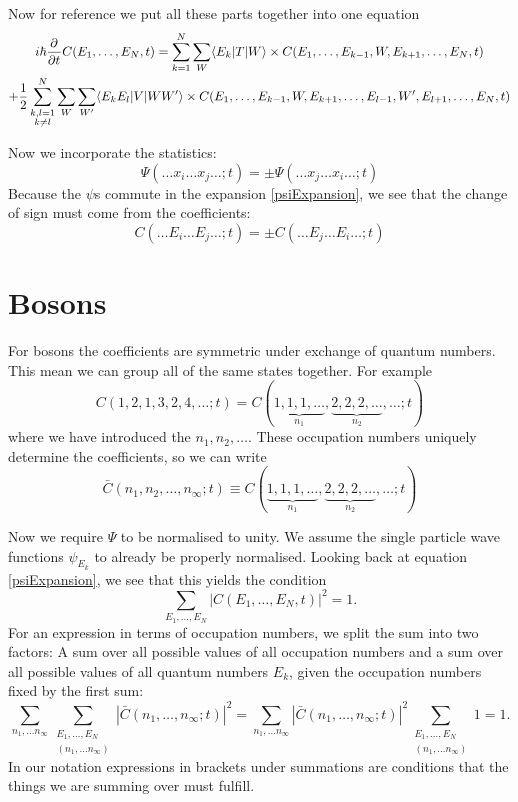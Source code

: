 Now for reference we put all these parts together into one equation
\begin{multline}
i\hbar \pd{}{t} C(E_1, \ldots, E_N,t) = \sum^N_{k=1} \sum_{W} \braket[T]{E_k}{W} \times C(E_1, \ldots, E_{k-1}, W, E_{k+1}, \ldots, E_N,t) \\ +
\frac{1}{2}\sum^N_{\substack{k,l=1 \\ k \neq l}} \sum_W \sum_{W'} \braket[V]{E_kE_l}{WW'} \times C(E_1, \ldots, E_{k-1}, W, E_{k+1}, \ldots, E_{l-1},W',E_{l+1}, \ldots, E_N,t) \label{modSchr}
\end{multline}


Now we incorporate the statistics:
\[ \Psi(\ldots x_i \ldots x_j \ldots; t) = \pm \Psi(\ldots x_j \ldots x_i \ldots; t) \]
Because the $\psi$s commute in the expansion \ref{psiExpansion}, we see that the change of sign must come from the coefficients:
\[ C(\ldots E_i \ldots E_j \ldots;t) = \pm C(\ldots E_j \ldots E_i \ldots;t) \]

\section{Bosons}
For bosons the coefficients are symmetric under exchange of quantum numbers. This mean we can group all of the same states together. For example
\[ C(1,2,1,3,2,4,\ldots;t) = C(\underbrace{1,1,1,\dots}_{n_1},\underbrace{2,2,2,\dots}_{n_2}, \ldots ;t) \]
where we have introduced the  $n_1, n_2 ,\ldots$. These occupation numbers uniquely determine the coefficients, so we can write
\[ \bar{C}(n_1,n_2,\ldots,n_\infty; t) \equiv C(\underbrace{1,1,1,\dots}_{n_1},\underbrace{2,2,2,\dots}_{n_2}, \ldots ;t) \]

Now we require $\Psi$ to be normalised to unity. We assume the single particle wave functions $\psi_{E_k}$ to already be properly normalised. Looking back at equation \ref{psiExpansion}, we see that this yields the condition
\[ \sum_{E_1, \ldots, E_N}|C(E_1, \ldots, E_N,t)|^2 = 1. \]
For an expression in terms of occupation numbers, we split the sum into two factors: A sum over all possible values of all occupation numbers and a sum over all possible values of all quantum numbers $E_k$, given the occupation numbers fixed by the first sum:
\[ \sum_{n_1, \ldots n_\infty}\sum_{\substack{E_1, \ldots, E_N \\ (n_1, \ldots n_\infty)}} |\bar{C}(n_1,\ldots,n_\infty; t)|^2 = \sum_{n_1, \ldots n_\infty}|\bar{C}(n_1,\ldots,n_\infty; t)|^2\sum_{\substack{E_1, \ldots, E_N \\ (n_1, \ldots n_\infty)}} 1 = 1.  \]
In our notation expressions in brackets under summations are conditions that the things we are summing over must fulfill.

